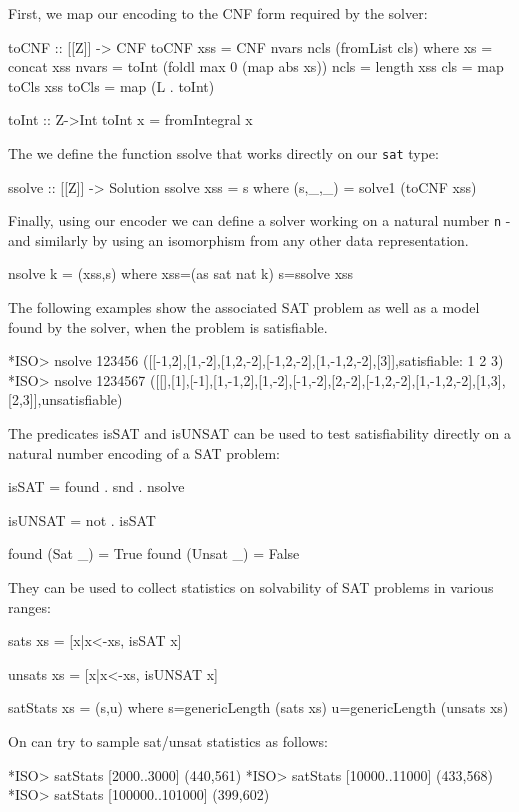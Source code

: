 \documentclass[]{INCLUDES/llncs}
\begin{document}
First, we map our encoding to the CNF form required by the solver:
\begin{code}
toCNF :: [[Z]] -> CNF
toCNF xss = CNF nvars ncls (fromList cls) where
  xs = concat xss
  nvars = toInt (foldl max 0 (map abs xs))
  ncls = length xss
  cls = map toCls xss
  toCls = map (L . toInt)

toInt :: Z->Int
toInt x = fromIntegral x
\end{code}
The we define the function ssolve that works directly on our {\tt sat} type:
\begin{code}
ssolve :: [[Z]] -> Solution
ssolve xss = s where
  (s,_,_) = solve1 (toCNF xss)
\end{code}
Finally, using our encoder we can define a solver  working on a natural number
{\tt n} - and similarly by using an isomorphism from any other data
representation.
\begin{code}
nsolve k  = (xss,s) where
  xss=(as sat nat k)
  s=ssolve xss
\end{code}
The following examples show the associated SAT problem as well as a model
found by the solver, when the problem is satisfiable.
\begin{codex}
*ISO> nsolve 123456
([[-1,2],[1,-2],[1,2,-2],[-1,2,-2],[1,-1,2,-2],[3]],satisfiable: 1 2 3)
*ISO> nsolve 1234567
([[],[1],[-1],[1,-1,2],[1,-2],[-1,-2],[2,-2],[-1,2,-2],[1,-1,2,-2],[1,3],[2,3]],unsatisfiable)
\end{codex}
The predicates isSAT and isUNSAT can be used to test satisfiability directly on
a natural number encoding of a SAT problem:
\begin{code}
isSAT = found . snd . nsolve

isUNSAT = not . isSAT
  
found (Sat _) = True
found (Unsat _) = False
\end{code}
They can be used to collect statistics on solvability of SAT problems in
various ranges:
\begin{code}
sats xs = [x|x<-xs, isSAT x]

unsats xs = [x|x<-xs, isUNSAT x]

satStats xs = (s,u) where 
  s=genericLength (sats xs)
  u=genericLength (unsats xs)
\end{code}
On can try to sample sat/unsat statistics as follows:
\begin{codex}
*ISO> satStats [2000..3000]
(440,561)
*ISO> satStats [10000..11000]
(433,568)
*ISO> satStats [100000..101000]
(399,602)
\end{codex}
\end{document}
